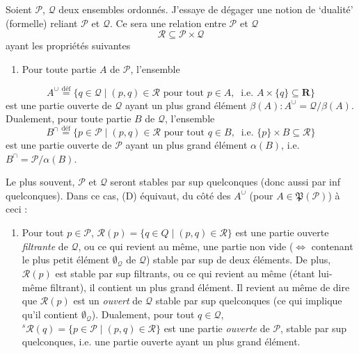 \documentclass[11pt]{article}
\newcommand{\msp}[1]{\marginpar{\footnotesize [#1]}}
\begin{document}
Soient $\mathcal{P}$, $\mathcal{Q}$ deux ensembles ordonnés. J'essaye de dégager une notion de `dualité' (formelle) reliant $\mathcal{P}$ et $\mathcal{Q}$. Ce sera une relation entre $\mathcal{P}$ et $\mathcal{Q}$
\[
\mathcal{R} \subseteq \mathcal{P} \times \mathcal{Q}
\tag*{(5.1)}
\]
ayant les propriétés suivantes
\begin{enumerate}[leftmargin=*, labelindent=0.5em]
\item[(D)] Pour toute partie $A$ de $\mathcal{P}$, l'ensemble
\end{enumerate}
\[
A^\cup \overset{\text{déf}}{=} \{ q \in \mathcal{Q} \mid (p,q) \in \mathcal{R} \text{ pour tout } p \in A,\ \text{ i.e. } A \times \{q\} \subseteq \mathbf{R} \} %
\]
est une partie ouverte de $\mathcal{Q}$ ayant un plus grand élément $\beta(A) : A^\cup = \mathcal{Q}/\beta(A)$. Dualement, pour toute partie $B$ de $\mathcal{Q}$, l'ensemble
\[
B^\cap \overset{\text{déf}}{=} \{ p \in \mathcal{P} \mid (p,q) \in \mathcal{R} \text{ pour tout } q \in B,\ \text{ i.e. } \{p\} \times B \subseteq \mathcal{R} \}
\]
est une partie ouverte de $\mathcal{P}$ ayant un plus grand élément $\alpha(B)$, i.e. $B^\cap = \mathcal{P}/\alpha(B)$.

Le plus souvent, $\mathcal{P}$ et $\mathcal{Q}$ seront stables par sup quelconques (donc aussi par inf quelconques). Dans ce cas, (D) équivaut, du côté des $A^\cup$ (pour $A \in \mathfrak{P}(\mathcal{P})$) à ceci :
\begin{enumerate}[leftmargin=*, labelindent=0em]
\item[(D$_0$)] Pour tout $p \in \mathcal{P}$, $\mathcal{R}(p) = \{ q \in Q \mid (p,q) \in \mathcal{R} \}$ est une partie ouverte \textit{filtrante} de $\mathcal{Q}$, ou ce qui revient au même, une partie non vide ($\Longleftrightarrow$ contenant le plus petit élément $\emptyset_{\mathcal{Q}}$ de $\mathcal{Q}$) stable par sup de deux éléments. De plus, $\mathcal{R}(p)$ est stable par sup filtrants, ou ce qui revient au même (étant lui-même filtrant), il contient un plus grand élément. Il revient %
\msp{page 70}
au même de dire que $\mathcal{R}(p)$ est un \textit{ouvert} de $\mathcal{Q}$ stable par sup quelconques (ce qui implique qu'il contient $\emptyset_{\mathcal{Q}}$). Dualement, pour tout $q \in \mathcal{Q}$, ${}^{s}\mathcal{R}(q) = \{ p \in \mathcal{P} \mid (p,q) \in \mathcal{R} \}$ est une partie \textit{ouverte} de $\mathcal{P}$, stable par sup quelconques, i.e. une partie ouverte ayant un plus grand élément. %
\end{enumerate}
\end{document}
